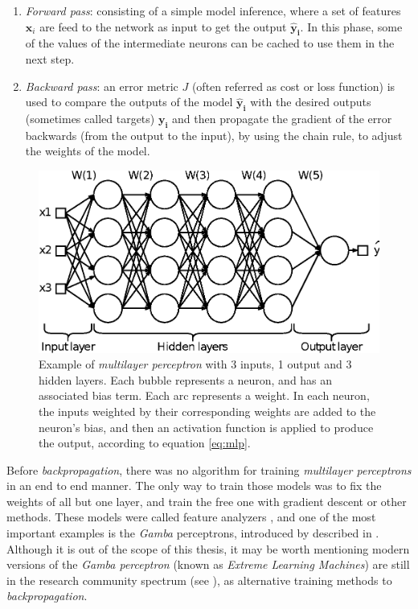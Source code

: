 \begin{enumerate}
\item \textit{Forward pass}: consisting of a simple model inference, where a set of features $\mathbf{x}_i$ are feed to the network as input to get the output $\mathbf{\hat{y}_i}$. In this phase, some of the values of the intermediate neurons can be cached to use them in the next step.

\item \textit{Backward pass}: an error metric $J$ (often referred as cost or loss function) is used to compare the outputs of the model $\mathbf{\hat{y}_i}$ with the desired outputs (sometimes called targets) $\mathbf{y_i}$ and then propagate the gradient of the error backwards (from the output to the input), by using the chain rule, to adjust the weights of the model.
\end{enumerate}


\begin{figure}
	\centering
	\includegraphics[width=0.8\linewidth]{chapter2/images/mlp}
	\caption{Example of \textit{multilayer perceptron} with 3 inputs, 1 output and 3 hidden layers. Each bubble represents a neuron, and has an associated bias term. Each arc represents a weight. In each neuron, the inputs weighted by their corresponding weights are added to the neuron's bias, and then an activation function is applied to produce the output, according to equation \ref{eq:mlp}.}
	\label{fig:mlp}
\end{figure}


Before \textit{backpropagation}, there was no algorithm for training \textit{multilayer perceptrons} in an end to end manner. The only way to train those models was to fix the weights of all but one layer, and train the free one with gradient descent or other methods. These models were called feature analyzers \autocite{hinton1986}, and one of the most important examples is the \textit{Gamba} perceptrons, introduced by described in \autocite{minsky69}. Although it is out of the scope of this thesis, it may be worth mentioning modern versions of the \textit{Gamba perceptron} (known as \textit{Extreme Learning Machines}) are still in the research community spectrum (see \autocite{Huang2006, Huang2012}), as alternative training methods to \textit{backpropagation}.

